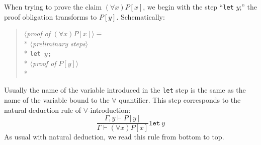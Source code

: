 \begin{node}\label{mizar-0004}%
When trying to prove the claim $(\forall x)P[x]$, we begin with the step
``\texttt{let} $y$;'' the proof obligation transforms to
$P[y]$. Schematically:
\begin{verse}
$\langle$\emph{proof of \/}$(\forall x)P[x]\rangle \equiv$\\*
\qquad $\langle$\emph{preliminary steps\/}$\rangle$\\*
\qquad \texttt{let }$y$\texttt{;}\\*
\qquad $\langle$\emph{proof of \/}$P[y]\rangle$\\*
\end{verse}
Usually the name of the variable introduced in the \texttt{let} step is
the same as the name of the variable bound to the $\forall$ quantifier.
This step corresponds to the natural deduction rule of
$\forall$-introduction:
\begin{equation*}
\frac{\Gamma,y\vdash P[y]}{\Gamma\vdash(\forall x)P[x]}\mathtt{let\ }y
\end{equation*}
As usual with natural deduction, we read this rule from bottom to top.
\end{node}

